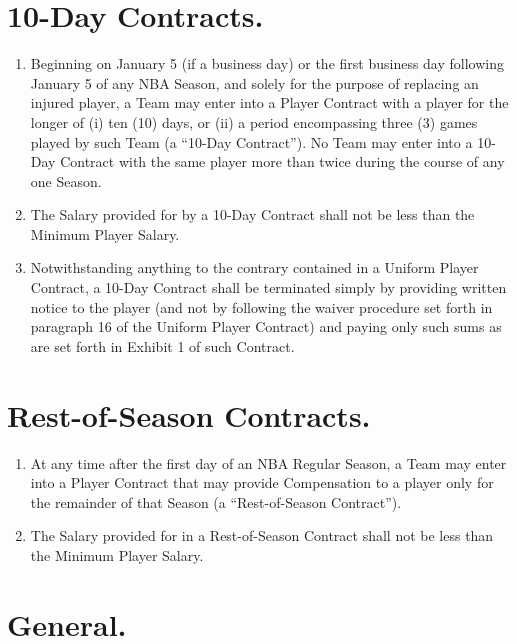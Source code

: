 \documentclass[
]{book}
\providecommand{\tightlist}{%
  \setlength{\itemsep}{0pt}\setlength{\parskip}{0pt}}
\begin{document}
\hypertarget{day-contracts.}{%
\section{10-Day Contracts.}\label{day-contracts.}}

\begin{enumerate}
\def\labelenumi{(\alph{enumi})}
\tightlist
\item
  Beginning on January 5 (if a business day) or the first business day following January 5 of any NBA Season, and solely for the purpose of replacing an injured player, a Team may enter into a Player Contract with a player for the longer of (i) ten (10) days, or (ii) a period encompassing three (3) games played by such Team (a ``10-Day Contract''). No Team may enter into a 10-Day Contract with the same player more than twice during the course of any one Season.
\item
  The Salary provided for by a 10-Day Contract shall not be less than the Minimum Player Salary.
\item
  Notwithstanding anything to the contrary contained in a Uniform Player Contract, a 10-Day Contract shall be terminated simply by providing written notice to the player (and not by following the waiver procedure set forth in paragraph 16 of the Uniform Player Contract) and paying only such sums as are set forth in Exhibit 1 of such Contract.
\end{enumerate}

\hypertarget{rest-of-season-contracts.}{%
\section{Rest-of-Season Contracts.}\label{rest-of-season-contracts.}}

\begin{enumerate}
\def\labelenumi{(\alph{enumi})}
\tightlist
\item
  At any time after the first day of an NBA Regular Season, a Team may enter into a Player Contract that may provide Compensation to a player only for the remainder of that Season (a ``Rest-of-Season Contract'').
\item
  The Salary provided for in a Rest-of-Season Contract shall not be less than the Minimum Player Salary.
\end{enumerate}

\hypertarget{general.}{%
\section{General.}\label{general.}}
\end{document}

